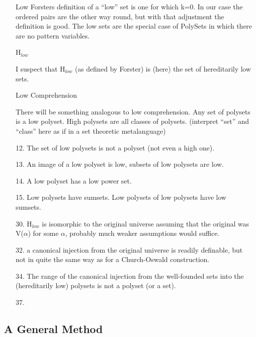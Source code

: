 \documentclass[numreferences]{rbjk}
\begin{document}
\begin{article}
\begin{itemize}
\begin{itemize}
\item[Low] Forsters definition of a ``low'' set is one for which k=0.
In our case the ordered pairs are the other way round, but with that adjustment the definition is good.
The low sets are the special case of PolySets in which there are no pattern variables.

\item[H$_{low}$]\ 

I suspect that H$_{low}$ (as defined by Forster\cite{forster2005}) is (here) the set of hereditarily low sets.

\item[Low Comprehension]\ 

There will be something analogous to low comprehension.
Any set of polysets is a low polyset.
High polysets are all classes of polysets.
(interpret ``set'' and ``class'' here as if in a set theoretic metalanguage)

\item[12.] The set of low polysets is not a polyset (not even a high one).

\item[13.] An image of a low polyset is low, subsets of low polysets are low.

\item[14.] A low polyset has a low power set.

\item[15.] Low polysets have sumsets. Low polysets of low polysets have low sumsets.

\item[30.] H$_{low}$ is isomorphic to the original universe assuming that the original was V($\alpha$) for some $\alpha$, probably much weaker assumptions would suffice.

\item[32.] a canonical injection from the original universe is readily definable, but not in quite the same way as for a Church-Oswald construction.

\item[34.] The range of the canonical injection from the well-founded sets into the (hereditarily low) polysets is not a polyset (or a set).

\item[37.] 

\end{itemize}
\end{itemize}

\subsection{A General Method}


\end{article}
\end{document}
